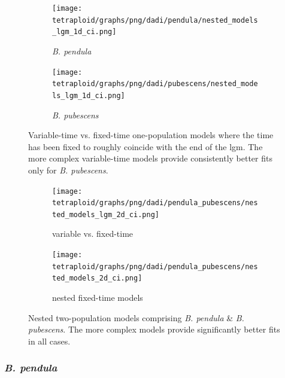 \documentclass[hidelinks,11pt]{article}
\newcommand{\pendula}{\textit{B. pendula}}
\newcommand{\pubescens}{\textit{B. pubescens}}
\begin{document}
    \begin{figure}[H]
        \centering
        \begin{subfigure}[b]{0.49\textwidth}
            \texttt{[image: tetraploid/graphs/png/dadi/pendula/nested\_models\_lgm\_1d\_ci.png]}
            \caption{\pendula{}}
        \end{subfigure}
        \hfill
        \begin{subfigure}[b]{0.49\textwidth}
            \texttt{[image: tetraploid/graphs/png/dadi/pubescens/nested\_models\_lgm\_1d\_ci.png]}
            \caption{\pubescens{}}
        \end{subfigure}
        \caption{Variable-time vs. fixed-time one-population models where the time has been fixed to roughly coincide with the end of the \acrshort{lgm}. The more complex variable-time models provide consistently better fits only for \pubescens{}.}
        \label{fig:nested_models_lgm_1d}
    \end{figure}

    \begin{figure}[H]
        \centering
        \begin{subfigure}[b]{0.497\textwidth}
            \texttt{[image: tetraploid/graphs/png/dadi/pendula\_pubescens/nested\_models\_lgm\_2d\_ci.png]}
            \caption{variable vs. fixed-time}
            \label{fig:nested_models_2d_lgm}
        \end{subfigure}
        \hfill
        \begin{subfigure}[b]{0.482\textwidth}
            \texttt{[image: tetraploid/graphs/png/dadi/pendula\_pubescens/nested\_models\_2d\_ci.png]}
            \caption{nested fixed-time models}
            \label{fig:nested_models_2d_sub}
        \end{subfigure}
        \caption{Nested two-population models comprising \pendula{} \& \pubescens{}. The more complex models provide significantly better fits in all cases.}
        \label{fig:nested_models_2d}
    \end{figure}

    \subsubsection{\pendula{}}
\end{document}
